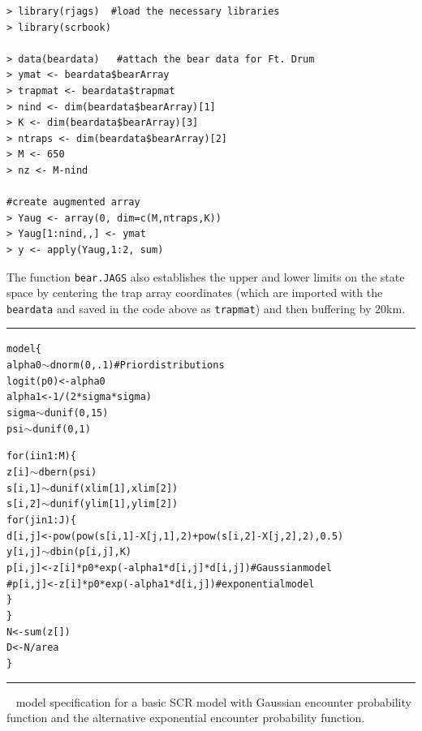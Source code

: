 \begin{verbatim}
> library(rjags)  #load the necessary libraries
> library(scrbook)

> data(beardata)   #attach the bear data for Ft. Drum
> ymat <- beardata$bearArray
> trapmat <- beardata$trapmat
> nind <- dim(beardata$bearArray)[1]
> K <- dim(beardata$bearArray)[3]
> ntraps <- dim(beardata$bearArray)[2]
> M <- 650
> nz <- M-nind

#create augmented array
> Yaug <- array(0, dim=c(M,ntraps,K))
> Yaug[1:nind,,] <- ymat
> y <- apply(Yaug,1:2, sum)
\end{verbatim}


The function {\tt bear.JAGS} also establishes the upper 
and lower limits on the state space by centering the trap
array coordinates (which are imported with the {\tt beardata}
and saved in the code above as {\tt trapmat}) and then buffering by 20km.  


\begin{panel}[htp]
\centering
\rule[0.1in]{\textwidth}{.03in}
{\small
\begin{alltt}
model\{
alpha0 \(\sim\) dnorm(0,.1)                         # Prior distributions
logit(p0) <- alpha0
alpha1 <- 1/(2*sigma*sigma)
sigma \(\sim\) dunif(0, 15)
psi \(\sim\) dunif(0,1)

for(i in 1:M)\{
 z[i] \(\sim\) dbern(psi)
 s[i,1] \(\sim\) dunif(xlim[1],xlim[2])
 s[i,2] \(\sim\) dunif(ylim[1],ylim[2])
for(j in 1:J)\{
  d[i,j] <- pow(pow(s[i,1]-X[j,1],2) + pow(s[i,2]-X[j,2],2),0.5)
  y[i,j] \(\sim\) dbin(p[i,j],K)
  p[i,j] <- z[i]*p0*exp(- alpha1*d[i,j]*d[i,j])  # Gaussian model
 #p[i,j] <- z[i]*p0*exp(- alpha1*d[i,j])         # exponential model
 \}
\}
N <- sum(z[])
D <- N/area
\}
\end{alltt}
}
\rule[-0.1in]{\textwidth}{.03in}
\caption{
\jags~ model specification for a basic SCR model with Gaussian
encounter probability function and the alternative exponential encounter probability function.}
\label{covariates.panel.basicSCR}
\end{panel}

